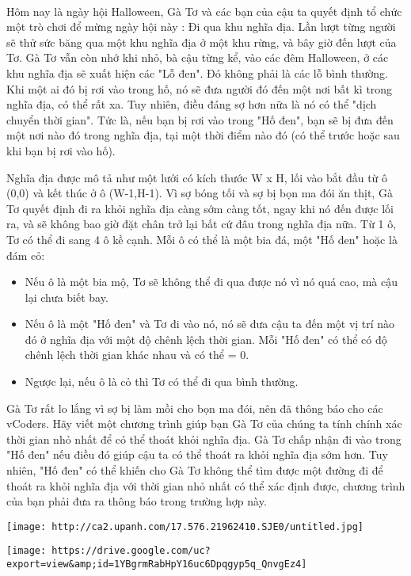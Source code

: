 

 

Hôm nay là ngày hội Halloween, Gà Tơ và các bạn của cậu ta quyết định tổ chức một trò chơi để mừng ngày hội này : Đi qua khu nghĩa địa. Lần lượt từng người sẽ thử sức băng qua một khu nghĩa địa ở một khu rừng, và bây giờ đến lượt của Tơ. Gà Tơ vẫn còn nhớ khi nhỏ, bà cậu từng kể, vào các đêm Halloween, ở các khu nghĩa địa sẽ xuất hiện các "Lỗ đen". Đó không phải là các lỗ bình thường. Khi một ai đó bị rơi vào trong hố, nó sẽ đưa người đó đến một nơi bất kì trong nghĩa địa, có thể rất xa. Tuy nhiên, điều đáng sợ hơn nữa là nó có thể "dịch chuyển thời gian". Tức là, nếu bạn bị rơi vào trong "Hố đen", bạn sẽ bị đưa đến một nơi nào đó trong nghĩa địa, tại một thời điểm nào đó (có thể trước hoặc sau khi bạn bị rơi vào hố).

Nghĩa địa được mô tả như một lưới có kích thước W x H, lối vào bắt đầu từ ô (0,0) và kết thúc ở ô (W-1,H-1). Vì sợ bóng tối và sợ bị bọn ma đói ăn thịt, Gà Tơ quyết định đi ra khỏi nghĩa địa càng sớm càng tốt, ngay khi nó đến được lối ra, và sẽ không bao giờ đặt chân trở lại bất cứ đâu trong nghĩa địa nữa. Từ 1 ô, Tơ có thể đi sang 4 ô kề cạnh. Mỗi ô có thể là một bia đá, một "Hố đen" hoặc là đám cỏ:
\begin{itemize}
	\item Nếu ô là một bia mộ, Tơ sẽ không thể đi qua được nó vì nó quá cao, mà cậu lại chưa biết bay.
	\item Nếu ô là một "Hố đen" và Tơ đi vào nó, nó sẽ đưa cậu ta đến một vị trí nào đó ở nghĩa địa với một độ chênh lệch thời gian. Mỗi "Hố đen" có thể có độ chênh lệch thời gian khác nhau và có thể = 0.
	\item Ngược lại, nếu ô là cỏ thì Tơ có thể đi qua bình thường.
\end{itemize}

Gà Tơ rất lo lắng vì sợ bị làm mồi cho bọn ma đói, nên đã thông báo cho các vCoders. Hãy viết một chương trình giúp bạn Gà Tơ của chúng ta tính chính xác thời gian nhỏ nhất để có thể thoát khỏi nghĩa địa. Gà Tơ chấp nhận đi vào trong "Hố đen" nếu điều đó giúp cậu ta có thể thoát ra khỏi nghĩa địa sớm hơn. Tuy nhiên, "Hố đen" có thể khiến cho Gà Tơ không thể tìm được một đường đi để thoát ra khỏi nghĩa địa với thời gian nhỏ nhất có thể xác định được, chương trình của bạn phải đưa ra thông báo trong trường hợp này.


\texttt{[image: http://ca2.upanh.com/17.576.21962410.SJE0/untitled.jpg]}


\texttt{[image: https://drive.google.com/uc?export=view\&amp;id=1YBgrmRabHpY16uc6Dpqgyp5q\_QnvgEz4]}

